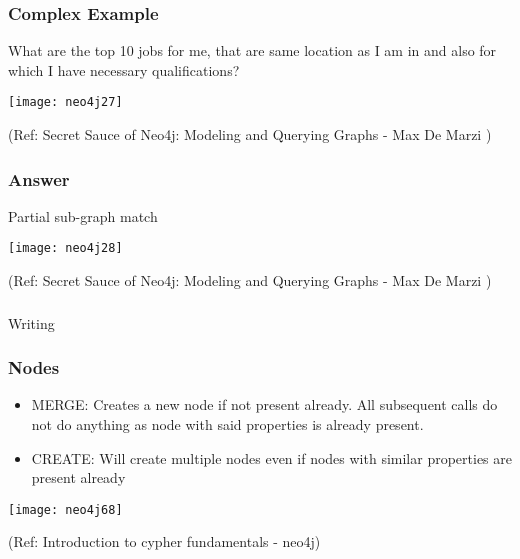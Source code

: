 \begin{frame}[fragile]\frametitle{Complex Example}
What are the top 10 jobs for me, that are same location as I am in and also for which I have necessary qualifications?

\begin{center}
\texttt{[image: neo4j27]}
\end{center}	    



{\tiny (Ref: Secret Sauce of Neo4j: Modeling and Querying Graphs
 - Max De Marzi )}

\end{frame}

\begin{frame}[fragile]\frametitle{Answer}

Partial sub-graph match

\begin{center}
\texttt{[image: neo4j28]}
\end{center}	    


{\tiny (Ref: Secret Sauce of Neo4j: Modeling and Querying Graphs
 - Max De Marzi )}

\end{frame}

\begin{frame}[fragile]\frametitle{}
\begin{center}
{\Large Writing}
\end{center}
\end{frame}



\begin{frame}[fragile]\frametitle{Nodes}

\begin{itemize}
\item MERGE: Creates a new node if not present already. All subsequent calls do not do anything as node with said properties is already present.

\item CREATE: Will create multiple nodes even if nodes with similar properties are present already
\end{itemize}

\begin{center}
\texttt{[image: neo4j68]}
\end{center}	  


{\tiny (Ref: Introduction to cypher fundamentals  - neo4j)}

\end{frame}

